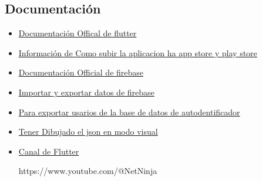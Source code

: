 \documentclass{article}
\begin{document}
\begin{flushleft}
    \subsection{Documentación}
    \begin{itemize}
        \item \href{https://docs.flutter.dev/get-started/install}{Documentación Offical de flutter}
        \item \href{https://www.apliarte.com/2024/10/implementacion-y-publicacion-de.html}{Información de Como subir la aplicacion ha app store y play store}
        \item \href{https://firebase.google.com/docs/flutter/setup?hl=es&platform=ios}{Documentación Official de firebase }
        \item \href{https://www.youtube.com/watch?v=VOC8gpnGvys}{Importar y exportar datos de firebase}

        \item \href{https://www.youtube.com/watch?v=IOfuM_0Gvvg}{Para exportar usarios de la base de datos de autodentificador}
        \item \href{https://jsoncrack.com/editor}{Tener Dibujado el json en modo visual}

        \item \href{https://www.youtube.com/@HeyFlutter}{Canal de Flutter}

        https://www.youtube.com/@NetNinja
    \end{itemize}

       

    \end{flushleft}
\end{document}
